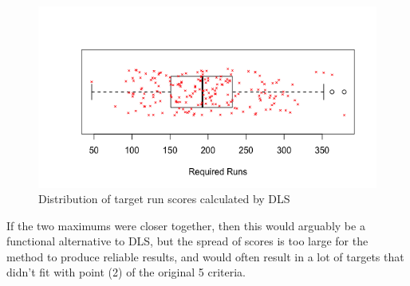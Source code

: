 \begin{figure}[h]
    \centering
    \includegraphics[scale=0.6]{figures/targetRunSpread.png}
    \caption{Distribution of target run scores calculated by DLS}
    \label{figure 2.2}
\end{figure}

If the two maximums were closer together, then this would arguably be a functional alternative to DLS, but the spread of scores is too large for the method to produce reliable results, and would often
result in a lot of targets that didn't fit with point (2) of the original 5 criteria.